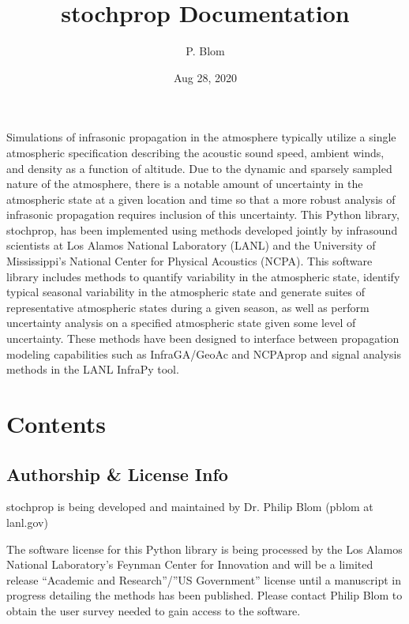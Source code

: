 \documentclass[letterpaper,10pt,english]{sphinxmanual}
\title{stochprop Documentation}
\date{Aug 28, 2020}
\author{P. Blom}
\begin{document}
\pagestyle{empty}
\sphinxmaketitle
\pagestyle{plain}
\sphinxtableofcontents
\pagestyle{normal}
\label{\detokenize{index::doc}}


Simulations of infrasonic propagation in the atmosphere typically utilize a single atmospheric specification describing the acoustic sound speed, ambient winds, and density as a function of altitude.  Due to the dynamic and sparsely sampled nature of the atmosphere, there is a notable amount of uncertainty in the atmospheric state at a given location and time so that a more robust analysis of infrasonic propagation requires inclusion of this uncertainty.  This Python library, stochprop, has been implemented using methods developed jointly by infrasound scientists at Los Alamos National Laboratory (LANL) and the University of Mississippi’s National Center for Physical Acoustics (NCPA).  This software library includes methods to quantify variability in the atmospheric state, identify typical seasonal variability in the atmospheric state and generate suites of representative atmospheric states during a given season, as well as perform uncertainty analysis on a specified atmospheric state given some level of uncertainty.  These methods have been designed to interface between propagation modeling capabilities such as InfraGA/GeoAc and NCPAprop and signal analysis methods in the LANL InfraPy tool.


\chapter{Contents}
\label{\detokenize{index:module-stochprop}}\label{\detokenize{index:contents}}

\section{Authorship \& License Info}
\label{\detokenize{authorship:authorship-license-info}}\label{\detokenize{authorship:authorship}}\label{\detokenize{authorship::doc}}
stochprop is being developed and maintained by Dr. Philip Blom (pblom at lanl.gov)

The software license for this Python library is being processed by the Los Alamos National Laboratory’s Feynman Center for Innovation and will be a limited release “Academic and Research”/”US Government” license until a manuscript in progress detailing the methods has been published.
Please contact Philip Blom to obtain the user survey needed to gain access to the software.
\end{document}
